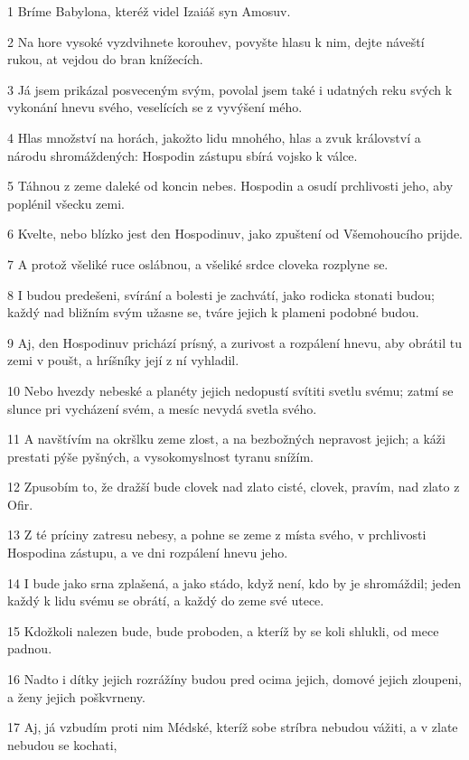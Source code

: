 \par 1 Bríme Babylona, kteréž videl Izaiáš syn Amosuv.
\par 2 Na hore vysoké vyzdvihnete korouhev, povyšte hlasu k nim, dejte náveští rukou, at vejdou do bran knížecích.
\par 3 Já jsem prikázal posveceným svým, povolal jsem také i udatných reku svých k vykonání hnevu svého, veselících se z vyvýšení mého.
\par 4 Hlas množství na horách, jakožto lidu mnohého, hlas a zvuk království a národu shromáždených: Hospodin zástupu sbírá vojsko k válce.
\par 5 Táhnou z zeme daleké od koncin nebes. Hospodin a osudí prchlivosti jeho, aby poplénil všecku zemi.
\par 6 Kvelte, nebo blízko jest den Hospodinuv, jako zpuštení od Všemohoucího prijde.
\par 7 A protož všeliké ruce oslábnou, a všeliké srdce cloveka rozplyne se.
\par 8 I budou predešeni, svírání a bolesti je zachvátí, jako rodicka stonati budou; každý nad bližním svým užasne se, tváre jejich k plameni podobné budou.
\par 9 Aj, den Hospodinuv prichází prísný, a zurivost a rozpálení hnevu, aby obrátil tu zemi v poušt, a hríšníky její z ní vyhladil.
\par 10 Nebo hvezdy nebeské a planéty jejich nedopustí svítiti svetlu svému; zatmí se slunce pri vycházení svém, a mesíc nevydá svetla svého.
\par 11 A navštívím na okršlku zeme zlost, a na bezbožných nepravost jejich; a káži prestati pýše pyšných, a vysokomyslnost tyranu snížím.
\par 12 Zpusobím to, že dražší bude clovek nad zlato cisté, clovek, pravím, nad zlato z Ofir.
\par 13 Z té príciny zatresu nebesy, a pohne se zeme z místa svého, v prchlivosti Hospodina zástupu, a ve dni rozpálení hnevu jeho.
\par 14 I bude jako srna zplašená, a jako stádo, když není, kdo by je shromáždil; jeden každý k lidu svému se obrátí, a každý do zeme své utece.
\par 15 Kdožkoli nalezen bude, bude proboden, a kteríž by se koli shlukli, od mece padnou.
\par 16 Nadto i dítky jejich rozrážíny budou pred ocima jejich, domové jejich zloupeni, a ženy jejich poškvrneny.
\par 17 Aj, já vzbudím proti nim Médské, kteríž sobe stríbra nebudou vážiti, a v zlate nebudou se kochati,
